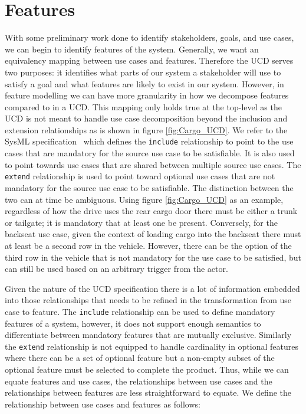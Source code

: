 \section{Features}

With some preliminary work done to identify stakeholders, goals, and use cases, we can begin to identify features of the system. Generally, we want an equivalency mapping between use cases and features. Therefore the \ac{UCD} serves two purposes: it identifies what parts of our system a stakeholder will use to satisfy a goal and what features are likely to exist in our system. However, in feature modelling we can have more granularity in how we decompose features compared to in a \ac{UCD}. This mapping only holds true at the top-level as the \ac{UCD} is not meant to handle use case decomposition beyond the inclusion and extension relationships as is shown in figure \ref{fig:Cargo_UCD}. We refer to the SysML specification~\cite{sysml2019omg} which defines the \texttt{include} relationship to point to the use cases that are mandatory for the source use case to be satisfiable. It is also used to point towards use cases that are shared between multiple source use cases. The \texttt{extend} relationship is used to point toward optional use cases that are not mandatory for the source use case to be satisfiable. The distinction between the two can at time be ambiguous. Using figure \ref{fig:Cargo_UCD} as an example, regardless of how the drive uses the rear cargo door there must be either a trunk or tailgate; it is mandatory that at least one be present. Conversely, for the backseat use case, given the context of loading cargo into the backseat there must at least be a second row in the vehicle. However, there can be the option of the third row in the vehicle that is not mandatory for the use case to be satisfied, but can still be used based on an arbitrary trigger from the actor.

Given the nature of the UCD specification there is a lot of information embedded into those relationships that needs to be refined in the transformation from use case to feature. The \texttt{include} relationship can be used to define mandatory features of a system, however, it does not support enough semantics to differentiate between mandatory features that are mutually exclusive. Similarly the \texttt{extend} relationship is not equipped to handle cardinality in optional features where there can be a set of optional feature but a non-empty subset of the optional feature must be selected to complete the product. Thus, while we can equate features and use cases, the relationships between use cases and the relationships between features are less straightforward to equate. We define the relationship between use cases and features as follows:

